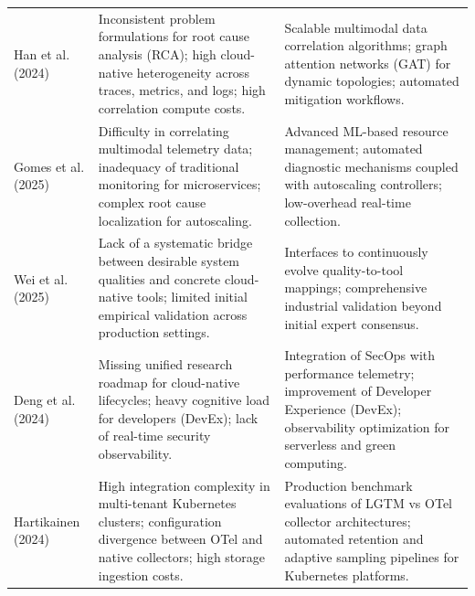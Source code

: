 \begin{table}[!ht]
\begin{tabular}{p{} p{} p{}}
Han et al. (2024)~\cite{han_2024} &
Inconsistent problem formulations for root cause analysis (RCA); high cloud-native heterogeneity across traces, metrics, and logs; high correlation compute costs. & 
Scalable multimodal data correlation algorithms; graph attention networks (GAT) for dynamic topologies; automated mitigation workflows. \\ \addlinespace

Gomes et al. (2025)~\cite{gomes_2025} &
Difficulty in correlating multimodal telemetry data; inadequacy of traditional monitoring for microservices; complex root cause localization for autoscaling. & 
Advanced ML-based resource management; automated diagnostic mechanisms coupled with autoscaling controllers; low-overhead real-time collection. \\ \addlinespace

Wei et al. (2025)~\cite{wei_2025} &
Lack of a systematic bridge between desirable system qualities and concrete cloud-native tools; limited initial empirical validation across production settings. &
Interfaces to continuously evolve quality-to-tool mappings; comprehensive industrial validation beyond initial expert consensus. \\ \addlinespace

Deng et al. (2024)~\cite{deng_2024} &
Missing unified research roadmap for cloud-native lifecycles; heavy cognitive load for developers (DevEx); lack of real-time security observability. & 
Integration of SecOps with performance telemetry; improvement of Developer Experience (DevEx); observability optimization for serverless and green computing. \\ \addlinespace

Hartikainen (2024)~\cite{hartikainen_2024} &
High integration complexity in multi-tenant Kubernetes clusters; configuration divergence between OTel and native collectors; high storage ingestion costs. &
Production benchmark evaluations of LGTM vs OTel collector architectures; automated retention and adaptive sampling pipelines for Kubernetes platforms. \\ \bottomrule
\end{tabular}
\end{table}
